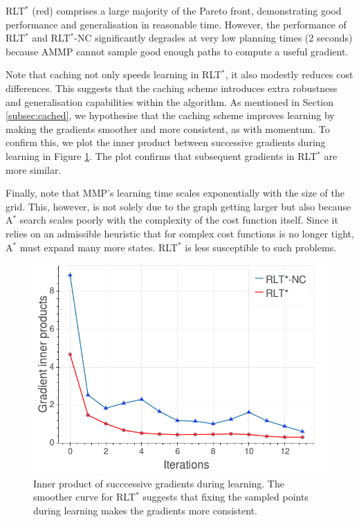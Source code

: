 \documentclass[a4paper,11pt]{report}
\begin{document}
 RLT$^*$ (red) comprises a large majority of the Pareto front, demonstrating good performance and generalisation in reasonable time.  However, the performance of RLT$^*$ and RLT$^*$-NC significantly degrades at very low planning times (2 seconds) because AMMP cannot sample good enough paths to compute a useful gradient.
 
 Note that caching not only speeds learning in RLT$^*$, it also modestly reduces cost differences. This suggests that the caching scheme introduces extra robustness and generalisation capabilities within the algorithm.  As mentioned in Section \ref{subsec:cached}, we hypothesise that the caching scheme improves learning by making the gradients smoother and more consistent, as with momentum. To confirm this, we plot the inner product between successive gradients during learning in Figure \ref{fig:in_prod_grad}. The plot confirms that subsequent gradients in RLT$^*$ are more similar.
 
 Finally, note that MMP's learning time scales exponentially with the size of the grid. This, however, is not solely due to the graph getting larger but also because A$^*$ search scales poorly with the complexity of the cost function itself. Since it relies on an admissible heuristic that for complex cost functions is no longer tight, A$^*$ must expand many more states.  RLT$^*$ is less susceptible to such problems.

 	\begin{figure}[tbh]
	\centering
    \includegraphics[scale=0.40]{figures/momentum.png}
    \caption[Inner product of succcessive gradients during learning]{Inner product of succcessive gradients during learning. The smoother curve for RLT$^*$ suggests that fixing the sampled points during learning makes the gradients more consistent. }
    \vspace{-2mm}
  \label{fig:in_prod_grad}
  \end{figure}
\end{document}
